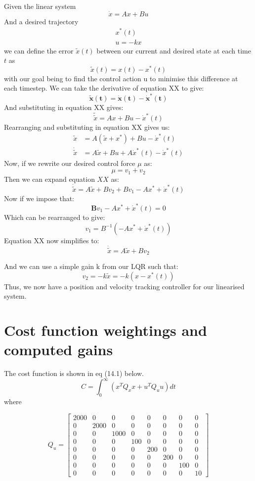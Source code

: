 \documentclass{UoNMCHA}
\numberwithin{equation}{section}
\begin{document}
	Given the linear system
	$$
	\dot{x}=A x+B u
	$$
	And a desired trajectory
	$$
	\begin{array}{c}
	x^{*}(t) \\
	u=-k x
	\end{array}
	$$
	we can define the error $\tilde{x}(t)$ between our current and desired state at each time $t$ as
	$$
	\tilde{x}(t)=x(t)-x^{*}(t)
	$$
	with our goal being to find the control action u to minimise this difference at each timestep.
	We can take the derivative of equation XX to give:
	$$
	\tilde{\boldsymbol{x}}(\boldsymbol{t})=\dot{\boldsymbol{x}}(\boldsymbol{t})-\dot{\boldsymbol{x}}^{*}(\boldsymbol{t})
	$$
	And substituting in equation XX gives:
	$$
	\tilde{\tilde{x}}=A x+B u-\dot{x}^{*}(t)
	$$
	Rearranging and substituting in equation XX gives us:
	$$
	\begin{aligned}
	\tilde{x} &=A\left(\tilde{x}+x^{*}\right)+B u-\dot{x}^{*}(t) \\
	\dot{\tilde{x}} &=A \tilde{x}+B u+A \dot{x}^{*}(t)-\dot{x}^{*}(t)
	\end{aligned}
	$$
	Now, if we rewrite our desired control force $\mu$ as:
	$$
	\mu=v_{1}+v_{2}
	$$
	Then we can expand equation $X X$ as:
	$$
	\dot{\tilde{x}}=A \tilde{x}+B v_{2}+B v_{1}-A x^{*}+\dot{x}^{*}(t)
	$$
	Now if we impose that:
	$$
	\boldsymbol{B} v_{1}-A x^{*}+\dot{x}^{*}(t)=0
	$$
	Which can be rearranged to give:
	$$
	v_{1}=B^{-1}\left(-A x^{*}+\dot{x}^{*}(t)\right)
	$$
	Equation XX now simplifies to:
	$$
	\dot{\tilde{x}}=A \tilde{x}+B v_{2}
	$$
	
	And we can use a simple gain $\mathrm{k}$ from our $\mathrm{LQR}$ such that:
	$$
	v_{2}=-k \tilde{x}=-k\left(x-x^{*}(t)\right)
	$$
	Thus, we now have a position and velocity tracking controller for our linearised system.
	
	\section{Cost function weightings and computed gains}
	
	The cost function is shown in eq (14.1) below.
	$$
	C=\int_{0}^{\infty}\left(x^{T} Q_{x} x+u^{T} Q_{u} u\right) d t
	$$
	where
	
	\begin{equation}
	Q_u = 
	\begin{bmatrix}2000 & 0 & 0 & 0 & 0 & 0 & 0 & 0 \\ 0 & 2000 & 0 & 0 & 0 & 0 & 0 & 0 \\ 0 & 0 & 1000 & 0 & 0 & 0 & 0 & 0 \\ 0 & 0 & 0 & 100 & 0 & 0 & 0 & 0 \\ 0 & 0 & 0 & 0 & 200 & 0 & 0 & 0 \\ 0 & 0 & 0 & 0 & 0 & 200 & 0 & 0 \\ 0 & 0 & 0 & 0 & 0 & 0 & 100 & 0 \\ 0 & 0 & 0 & 0 & 0 & 0 & 0 & 10\end{bmatrix}
	\end{equation}
	
\end{document}
